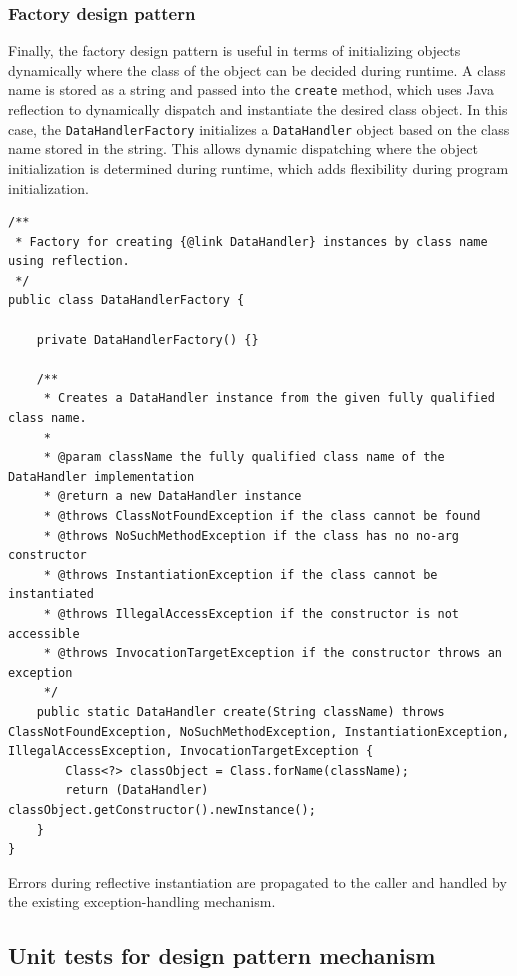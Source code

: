 \documentclass[a4paper]{scrartcl}
\begin{document}
\subsubsection{Factory design pattern}
Finally, the factory design pattern is useful in terms of initializing objects dynamically where the class of the object can be decided during runtime. A class name is stored as a string and passed into the \texttt{create} method, which uses Java reflection to dynamically dispatch and instantiate the desired class object. In this case, the \texttt{DataHandlerFactory} initializes a \texttt{DataHandler} object based on the class name stored in the string. This allows dynamic dispatching where the object initialization is determined during runtime, which adds flexibility during program initialization.

\begin{lstlisting}[style=javastyle, caption={DataHandlerFactory that instantiates data handler object dynamically}]
/**
 * Factory for creating {@link DataHandler} instances by class name using reflection.
 */
public class DataHandlerFactory {

    private DataHandlerFactory() {}

    /**
     * Creates a DataHandler instance from the given fully qualified class name.
     *
     * @param className the fully qualified class name of the DataHandler implementation
     * @return a new DataHandler instance
     * @throws ClassNotFoundException if the class cannot be found
     * @throws NoSuchMethodException if the class has no no-arg constructor
     * @throws InstantiationException if the class cannot be instantiated
     * @throws IllegalAccessException if the constructor is not accessible
     * @throws InvocationTargetException if the constructor throws an exception
     */
    public static DataHandler create(String className) throws ClassNotFoundException, NoSuchMethodException, InstantiationException, IllegalAccessException, InvocationTargetException {
        Class<?> classObject = Class.forName(className);
        return (DataHandler) classObject.getConstructor().newInstance();
    }
}
\end{lstlisting}

Errors during reflective instantiation are propagated to the caller and handled by the existing exception-handling mechanism.

\subsection{Unit tests for design pattern mechanism}
\end{document}
